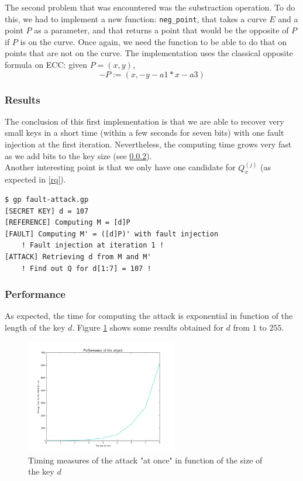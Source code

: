 \documentclass[journal]{IEEEtran}
\begin{document}
The second problem that was encountered was the substraction operation. To do this, we had to implement a new function: {\tt neg\_point}, that takes a curve $E$ and a point $P$ as a parameter, and that returns a point that would be the
opposite of $P$ if $P$ is on the curve. Once again, we need the function to be able to do that on points that are not on the curve. The implementation uses the classical opposite formula on ECC: given $P = (x, y)$,
$$- P := (x, -y - a1*x - a3)$$

\subsubsection{Results}
The conclusion of this first implementation is that we are able to recover very small keys in a short time (within a few seconds for seven bits) with one fault injection at the first iteration.
Nevertheless, the computing time grows very fast as we add bits to the key size (see \ref{perf-all}).\\
Another interesting point is that we only have one candidate for $Q_x^{(j)}$ (as expected in \ref{rq}).

\begin{footnotesize}
\begin{verbatim}
$ gp fault-attack.gp 
[SECRET KEY] d = 107
[REFERENCE] Computing M = [d]P
[FAULT] Computing M' = ([d]P)' with fault injection
    ! Fault injection at iteration 1 !
[ATTACK] Retrieving d from M and M'
    ! Find out Q for d[1:7] = 107 !
\end{verbatim}
\end{footnotesize}

\subsubsection{Performance}
\label{perf-all}
As expected, the time for computing the attack is exponential in function of the length of the key $d$. Figure \ref{first-attack-perf} shows some results obtained for $d$ from $1$ to $255$.
\begin{figure}
    \centering
    \includegraphics[width=250px]{img/first-attack-perf.png}
    \caption{Timing measures of the attack "at once" in function of the size of the key $d$}
    \label{first-attack-perf}
\end{figure}   
\end{document}
